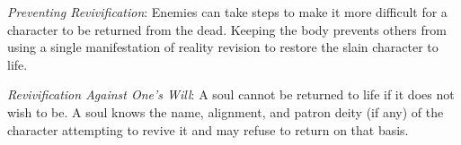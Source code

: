 \textit{Preventing Revivification}: Enemies can take steps to make it more difficult for a character to be returned from the dead. Keeping the body prevents others from using a single manifestation of reality revision to restore the slain character to life.

\textit{Revivification Against One's Will}: A soul cannot be returned to life if it does not wish to be. A soul knows the name, alignment, and patron deity (if any) of the character attempting to revive it and may refuse to return on that basis.